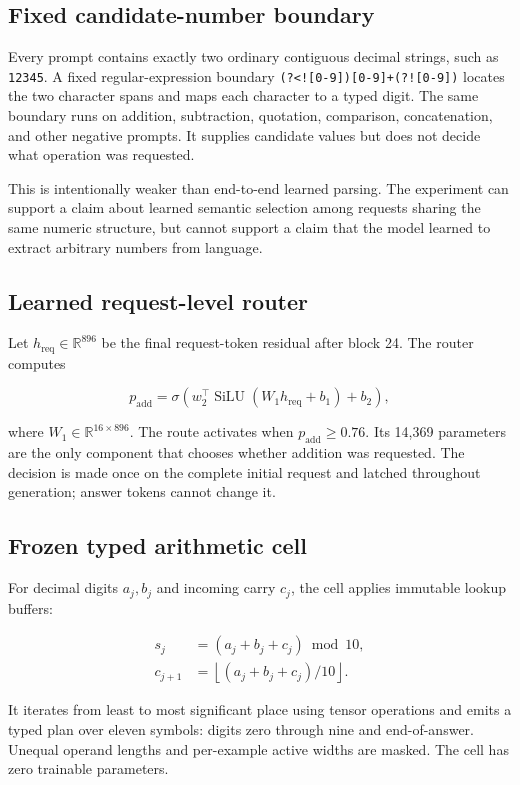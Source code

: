 \documentclass[11pt]{article}
\newcommand{\code}[1]{\texttt{#1}}
\begin{document}
\subsection{Fixed candidate-number boundary}

Every prompt contains exactly two ordinary contiguous decimal strings, such
as \code{12345}. A fixed regular-expression boundary
\code{(?<![0-9])[0-9]+(?![0-9])} locates the two character spans and maps each
character to a typed digit. The same boundary runs on addition, subtraction,
quotation, comparison, concatenation, and other negative prompts. It supplies
candidate values but does not decide what operation was requested.

This is intentionally weaker than end-to-end learned parsing. The experiment
can support a claim about learned semantic selection among requests sharing
the same numeric structure, but cannot support a claim that the model learned
to extract arbitrary numbers from language.

\subsection{Learned request-level router}

Let \(h_{\mathrm{req}}\in\mathbb{R}^{896}\) be the final request-token residual
after block 24. The router computes

\[
p_{\mathrm{add}} =
\sigma\left(w_2^\top\operatorname{SiLU}(W_1 h_{\mathrm{req}}+b_1)+b_2\right),
\]

where \(W_1\in\mathbb{R}^{16\times896}\). The route activates when
\(p_{\mathrm{add}}\geq0.76\). Its 14,369 parameters are the only component
that chooses whether addition was requested. The decision is made once on the
complete initial request and latched throughout generation; answer tokens
cannot change it.

\subsection{Frozen typed arithmetic cell}

For decimal digits \(a_j,b_j\) and incoming carry \(c_j\), the cell applies
immutable lookup buffers:

\begin{align}
s_j &= (a_j+b_j+c_j)\bmod 10,\\
c_{j+1} &= \left\lfloor(a_j+b_j+c_j)/10\right\rfloor.
\end{align}

It iterates from least to most significant place using tensor operations and
emits a typed plan over eleven symbols: digits zero through nine and
end-of-answer. Unequal operand lengths and per-example active widths are
masked. The cell has zero trainable parameters.
\end{document}
